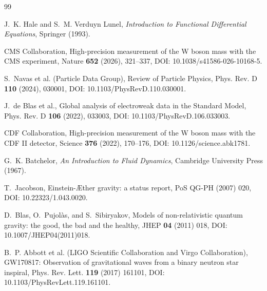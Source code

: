 \documentclass[11pt]{article}
\theoremstyle{definition}
\theoremstyle{plain}
\theoremstyle{remark}
\begin{document}
        \begin{thebibliography}{99}
            
            J.~K. Hale and S.~M. Verduyn Lunel,
            \newblock \emph{Introduction to Functional Differential Equations},
            \newblock Springer (1993).
            
            CMS Collaboration,
            \newblock High-precision measurement of the W boson mass with the CMS experiment,
            \newblock Nature \textbf{652} (2026), 321--337,
            \newblock DOI: 10.1038/s41586-026-10168-5.
            
            S.~Navas et al. (Particle Data Group),
            \newblock Review of Particle Physics,
            \newblock Phys. Rev. D \textbf{110} (2024), 030001,
            \newblock DOI: 10.1103/PhysRevD.110.030001.
            
            J.~de Blas et al.,
            \newblock Global analysis of electroweak data in the Standard Model,
            \newblock Phys. Rev. D \textbf{106} (2022), 033003,
            \newblock DOI: 10.1103/PhysRevD.106.033003.
            
            CDF Collaboration,
            \newblock High-precision measurement of the W boson mass with the CDF II detector,
            \newblock Science \textbf{376} (2022), 170--176,
            \newblock DOI: 10.1126/science.abk1781.
            
            G.~K. Batchelor,
            \newblock \emph{An Introduction to Fluid Dynamics},
            \newblock Cambridge University Press (1967).

            T.~Jacobson,
            \newblock Einstein-\AE ther gravity: a status report,
            \newblock PoS QG-PH (2007) 020,
            \newblock DOI: 10.22323/1.043.0020.

            D.~Blas, O.~Pujol\`as, and S.~Sibiryakov,
            \newblock Models of non-relativistic quantum gravity: the good, the bad and the healthy,
            \newblock JHEP \textbf{04} (2011) 018,
            \newblock DOI: 10.1007/JHEP04(2011)018.

            B.~P. Abbott et al. (LIGO Scientific Collaboration and Virgo Collaboration),
            \newblock GW170817: Observation of gravitational waves from a binary neutron star inspiral,
            \newblock Phys. Rev. Lett. \textbf{119} (2017) 161101,
            \newblock DOI: 10.1103/PhysRevLett.119.161101.


\end{thebibliography}
\end{document}
